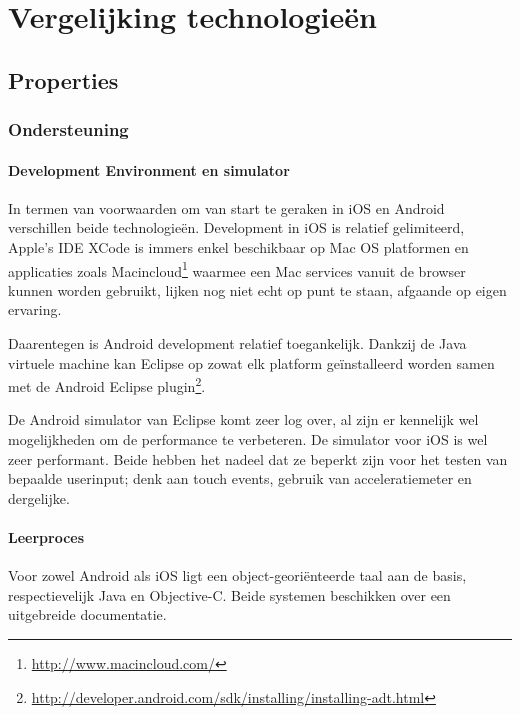 \chapter{Vergelijking technologie\"en}\label{chapter:vergelijking_technologieen}

\section{Properties}\label{section:properties_technologieen}

\subsection{Ondersteuning}

\subsubsection{Development Environment en simulator}

In termen van voorwaarden om van start te geraken in iOS en Android verschillen beide technologie\"en. Development in iOS is relatief gelimiteerd, Apple's IDE XCode is immers enkel beschikbaar op Mac OS platformen\cite{goadrich2011} en applicaties zoals Macincloud\footnote{\url{http://www.macincloud.com/}} waarmee een Mac services vanuit de browser kunnen worden gebruikt\cite{macincloud2013}, lijken nog niet echt op punt te staan, afgaande op eigen ervaring.

Daarentegen is Android development relatief toegankelijk. Dankzij de Java virtuele machine kan Eclipse op zowat elk platform ge\"installeerd worden samen met de Android Eclipse plugin\footnote{\url{http://developer.android.com/sdk/installing/installing-adt.html}}.

De Android simulator van Eclipse komt zeer log over, al zijn er kennelijk wel mogelijkheden om de performance te verbeteren\cite{stackoverflow2012}. De simulator voor iOS is wel zeer performant. Beide hebben het nadeel dat ze beperkt zijn voor het testen van bepaalde userinput; denk aan touch events, gebruik van acceleratiemeter en dergelijke\cite{goadrich2011}.


\subsubsection{Leerproces}

Voor zowel Android als iOS ligt een object-geori\"enteerde taal aan de basis, respectievelijk Java en Objective-C. Beide systemen beschikken over een uitgebreide documentatie.

